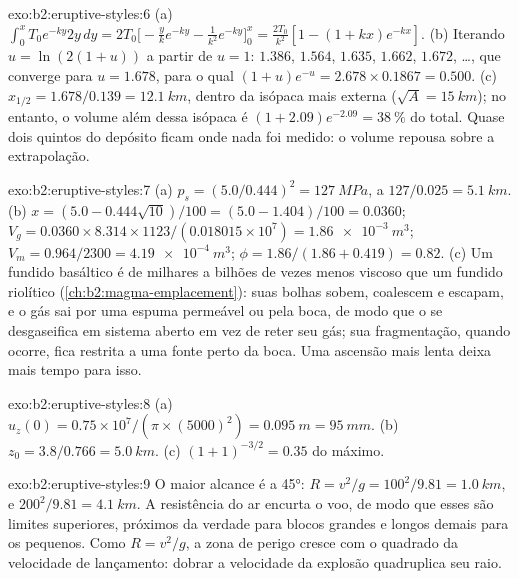 \begin{solution}{exo:b2:eruptive-styles:6}
(a) $\int_0^x T_0e^{-ky}2y\,dy = 2T_0\big[-\tfrac{y}{k}e^{-ky} - \tfrac{1}{k^2}e^{-ky}\big]_0^x
= \tfrac{2T_0}{k^2}[1 - (1 + kx)e^{-kx}]$. (b) Iterando $u = \ln(2(1 + u))$ a partir de
$u = 1$: $1.386$, $1.564$, $1.635$, $1.662$, $1.672$, \dots, que converge para
$u = 1.678$, para o qual $(1 + u)e^{-u} = 2.678\times0.1867 = 0.500$. (c) $x_{1/2} =
1.678/0.139 = \qty{12.1}{km}$, dentro da isópaca mais externa ($\sqrt A =
\qty{15}{km}$); no entanto, o volume além dessa isópaca é $(1 + 2.09)e^{-2.09} =
\qty{38}{\percent}$ do total. Quase dois quintos do depósito ficam onde
nada foi medido: o volume repousa sobre a extrapolação.
\end{solution}

\begin{solution}{exo:b2:eruptive-styles:7}
(a) $p_s = (5.0/0.444)^2 = \qty{127}{MPa}$, a $127/0.025 = \qty{5.1}{km}$.
(b) $x = (5.0 - 0.444\sqrt{10})/100 = (5.0 - 1.404)/100 = 0.0360$;
$V_g = 0.0360\times8.314\times1123/(0.018015\times10^7) = \qty{1.86e-3}{m^3}$;
$V_m = 0.964/2300 = \qty{4.19e-4}{m^3}$; $\phi = 1.86/(1.86 + 0.419) = 0.82$.
(c) Um fundido basáltico é de milhares a bilhões de vezes menos viscoso que um
fundido riolítico (\cref{ch:b2:magma-emplacement}): suas bolhas sobem,
coalescem e escapam, e o gás sai por uma espuma permeável ou pela
boca, de modo que o  se desgaseifica em sistema aberto em vez de reter seu gás; sua
fragmentação, quando ocorre, fica restrita a uma fonte perto da boca. Uma ascensão mais
lenta deixa mais tempo para isso.
\end{solution}

\begin{solution}{exo:b2:eruptive-styles:8}
(a) $u_z(0) = 0.75\times10^7/(\pi\times(5000)^2) = \qty{0.095}{m} = \qty{95}{mm}$.
(b) $z_0 = 3.8/0.766 = \qty{5.0}{km}$. (c) $(1 + 1)^{-3/2} = 0.35$ do
máximo.
\end{solution}

\begin{solution}{exo:b2:eruptive-styles:9}
O maior alcance é a \ang{45}: $R = v^2/g = 100^2/9.81 = \qty{1.0}{km}$, e
$200^2/9.81 = \qty{4.1}{km}$. A resistência do ar encurta o voo, de modo que esses são
limites superiores, próximos da verdade para blocos grandes e longos demais para os pequenos.
Como $R = v^2/g$, a zona de perigo cresce com o quadrado da velocidade de lançamento:
dobrar a velocidade da explosão quadruplica seu raio.
\end{solution}


